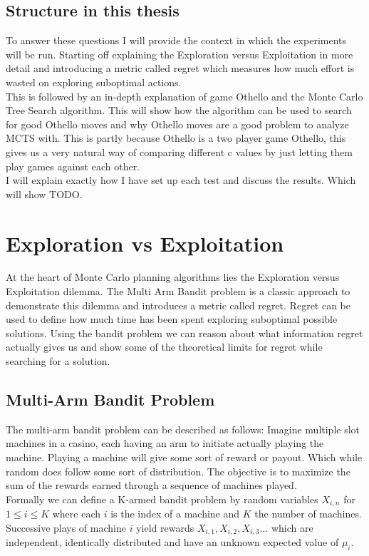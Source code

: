 \documentclass[11pt,a4paper]{article}
\begin{document}
\subsection{Structure in this thesis}
To answer these questions I will provide the context in which the experiments will be run. Starting off explaining the Exploration versus Exploitation in more detail and introducing a metric called regret which measures how much effort is wasted on exploring suboptimal actions.\\ This is followed by an in-depth explanation of game Othello and the Monte Carlo Tree Search algorithm. This will show how the algorithm can be used to search for good Othello moves and why Othello moves are a good problem to analyze MCTS with. This is partly because Othello is a two player game Othello, this gives us a very natural way of comparing different c values by just letting them play games against each other.\\
I will explain exactly how I have set up each test and discuss the results. Which will show TODO.



\section{Exploration vs Exploitation}
At the heart of Monte Carlo planning algorithms lies the Exploration versus Exploitation dilemma. The Multi Arm Bandit problem is a classic approach to demonstrate this dilemma and introduces a metric called regret. Regret can be used to define how much time has been spent exploring suboptimal possible solutions. Using the bandit problem we can reason about what information regret actually gives us and show some of the theoretical limits for regret while searching for a solution.

\subsection{Multi-Arm Bandit Problem}
The multi-arm bandit problem can be described as follows: Imagine multiple slot machines in a casino, each having an arm to initiate actually playing the machine. Playing a machine will give some sort of reward or payout. Which while random does follow some sort of distribution. The objective is to maximize the sum of the rewards earned through a sequence of machines played.\\

Formally we can define a K-armed bandit problem by random variables $X_{i,n}$ for $1 \leq i \leq K$ where each $i$ is the index of a machine and $K$ the number of machines. Successive plays of machine $i$ yield rewards $X_{i,1},X_{i,2},X_{i,3}...$ which are independent, identically distributed and have an unknown expected value of $\mu_i$.
\end{document}
